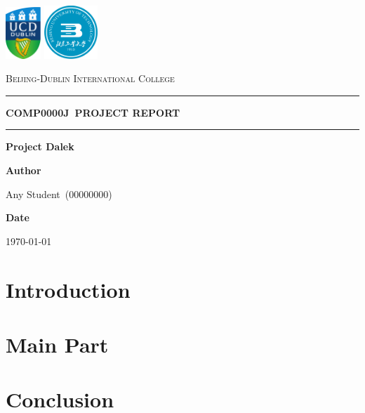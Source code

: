 \documentclass{article}
\newcommand{\name}{Any Student}
\newcommand{\idnumber}{00000000}
\newcommand{\coursecode}{COMP0000J}
\newcommand{\HRule}[1]{\rule{\linewidth}{#1}}
\begin{document}
\begin{titlepage}
    \centering
    \vspace*{1cm}
    \includegraphics[width=0.1\textwidth]{images/UCD_Logo.pdf} \hspace{0.5cm}
    \includegraphics[width=0.15\textwidth]{images/BJUT_Logo.pdf} \par
    \vspace{0.8cm}
    {\Large \textsc{Beijing-Dublin International College}} \par
    \vspace{1.5cm}
    \HRule{0.2pt} \par
    \vspace{0.5cm}
    {\huge \textbf{\uppercase{\coursecode \ Project Report}}} \par
    \vspace{0cm}
    \HRule{0.2pt} \par
    \vspace{1.0cm}
    {\LARGE \textbf{Project Dalek}} \par
    \vspace{8cm}
    \textbf{Author} \par
    \name \ (\idnumber) \par
    \vspace{1cm}
    \textbf{Date} \par
    \today \par
    \vfill
\end{titlepage}

\tableofcontents
\newpage

\begin{abstract}
    
\end{abstract}

\section{Introduction}
    


\section{Main Part}
    
    

\section{Conclusion}
    



\end{document}
